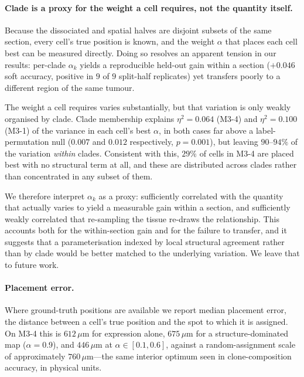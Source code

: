 
\paragraph{Clade is a proxy for the weight a cell requires, not the quantity itself.}
Because the dissociated and spatial halves are disjoint subsets of the same section, every
cell's true position is known, and the weight $\alpha$ that places each cell best can be
measured directly. Doing so resolves an apparent tension in our results: per-clade $\alpha_k$
yields a reproducible held-out gain within a section ($+0.046$ soft accuracy, positive in $9$ of
$9$ split-half replicates) yet transfers poorly to a different region of the same tumour.

The weight a cell requires varies substantially, but that variation is only weakly organised by
clade. Clade membership explains $\eta^2 = 0.064$ (M3-4) and $\eta^2 = 0.100$ (M3-1) of the
variance in each cell's best $\alpha$, in both cases far above a label-permutation null
($0.007$ and $0.012$ respectively, $p = 0.001$), but leaving $90$--$94\%$ of the variation
\emph{within} clades. Consistent with this, $29\%$ of cells in M3-4 are placed best with no
structural term at all, and these are distributed across clades rather than concentrated in any
subset of them.

We therefore interpret $\alpha_k$ as a proxy: sufficiently correlated with the quantity that
actually varies to yield a measurable gain within a section, and sufficiently weakly correlated
that re-sampling the tissue re-draws the relationship. This accounts both for the within-section
gain and for the failure to transfer, and it suggests that a parameterisation indexed by local
structural agreement rather than by clade would be better matched to the underlying variation.
We leave that to future work.

\paragraph{Placement error.}
Where ground-truth positions are available we report median placement error, the distance
between a cell's true position and the spot to which it is assigned. On M3-4 this is $612\,\mu$m
for expression alone, $675\,\mu$m for a structure-dominated map ($\alpha = 0.9$), and
$446\,\mu$m at $\alpha \in [0.1, 0.6]$, against a random-assignment scale of approximately
$760\,\mu$m---the same interior optimum seen in clone-composition accuracy, in physical units.

